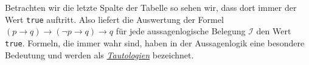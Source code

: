 \begin{table}[!ht]
  \centering
{}
  \caption{Berechnung der Wahrheitswerte von $(p \rightarrow q) \rightarrow (\neg p \rightarrow q) \rightarrow q$.}
  \label{tab:tautologie}
\end{table}

Betrachten wir die letzte Spalte der Tabelle so sehen wir, dass dort immer der Wert
\texttt{true} auftritt.  Also liefert die Auswertung der Formel
$(p \rightarrow q) \rightarrow (\neg p \rightarrow q) \rightarrow q $
f\"{u}r jede aussagenlogische Belegung $\mathcal{I}$ den Wert \texttt{true}.  
Formeln, die immer wahr sind, haben in der Aussagenlogik eine besondere Bedeutung und
werden als \href{https://en.wikipedia.org/wiki/Tautology_(logic)}{\emph{Tautologien}} bezeichnet.

